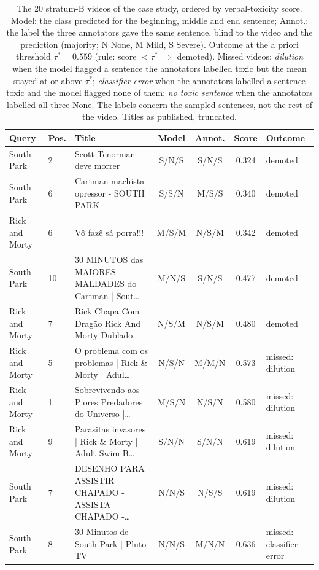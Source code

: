 \begin{table}[!t]
\centering
\small
\caption{The 20 stratum-B videos of the case study, ordered by verbal-toxicity score. Model: the class predicted for the beginning, middle and end sentence; Annot.: the label the three annotators gave the same sentence, blind to the video and the prediction (majority; N None, M Mild, S Severe). Outcome at the a priori threshold $\tau^{*} = 0.559$ (rule: score $< \tau^{*}$ $\Rightarrow$ demoted). Missed videos: \emph{dilution} when the model flagged a sentence the annotators labelled toxic but the mean stayed at or above $\tau^{*}$; \emph{classifier error} when the annotators labelled a sentence toxic and the model flagged none of them; \emph{no toxic sentence} when the annotators labelled all three None. The labels concern the sampled sentences, not the rest of the video. Titles as published, truncated.}
\label{tab:estrato-b}
\begin{tabular}{@{}llp{}cccl@{}}
\toprule
Query & Pos. & Title & Model & Annot. & Score & Outcome \\
\midrule
South Park & 2 & Scott Tenorman deve morrer & S/N/S & S/N/S & 0.324 & demoted \\
South Park & 6 & Cartman machista opressor - SOUTH PARK & S/S/N & M/S/S & 0.340 & demoted \\
Rick and Morty & 6 & Vô fazê sá porra!!! & M/S/M & N/S/M & 0.342 & demoted \\
South Park & 10 & 30 MINUTOS das MAIORES MALDADES do Cartman | Sout… & M/N/S & S/N/S & 0.477 & demoted \\
Rick and Morty & 7 & Rick Chapa Com Dragão Rick And Morty Dublado & N/S/M & N/S/M & 0.480 & demoted \\
Rick and Morty & 5 & O problema com os problemas | Rick \& Morty | Adul… & N/S/N & M/M/N & 0.573 & missed: dilution \\
Rick and Morty & 1 & Sobrevivendo aos Piores Predadores do Universo |… & M/S/N & N/S/N & 0.580 & missed: dilution \\
Rick and Morty & 9 & Parasitas invasores | Rick \& Morty | Adult Swim B… & S/N/N & S/N/N & 0.619 & missed: dilution \\
South Park & 7 & DESENHO PARA ASSISTIR CHAPADO - ASSISTA CHAPADO -… & N/N/S & N/S/S & 0.619 & missed: dilution \\
South Park & 8 & 30 Minutos de South Park | Pluto TV & N/N/S & M/N/N & 0.636 & missed: classifier error \\

\end{tabular}
\end{table}
